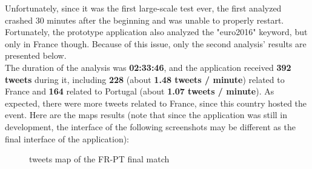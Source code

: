 \documentclass[a4paper,11pt]{report}
\begin{document}
Unfortunately, since it was the first large-scale test ever, the first analyzed crashed 30 minutes after the beginning and was unable to properly restart. Fortunately, the prototype application also analyzed the "euro2016" keyword, but only in France though. Because of this issue, only the second analysis' results are presented below.\\

The duration of the analysis was \textbf{02:33:46}, and the application received \textbf{392 tweets} during it, including \textbf{228} (about \textbf{1.48 tweets / minute}) related to France and \textbf{164} related to Portugal (about \textbf{1.07 tweets / minute}). As expected, there were more tweets related to France, since this country hosted the event. Here are the maps results (note that since the application was still in development, the interface of the following screenshots may be different as the final interface of the application):
\begin{figure}[H]
\vspace{-5pt}
\begin{center}
\vspace{-20pt}
\caption{tweets map of the FR-PT final match}
\end{center}
\end{figure}
\vspace{-10pt}
\end{document}
